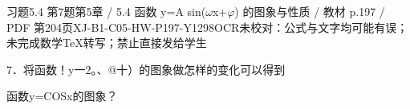 \begin{bankitem}{习题5.4 第7题}{第5章 / 5.4 函数 y=A sin(\ensuremath{\omega}x+\ensuremath{\varphi}) 的图象与性质 / 教材 p.197 / PDF 第204页}{XJ-B1-C05-HW-P197-Y1298}{OCR未校对：公式与文字均可能有误；未完成数学TeX转写；禁止直接发给学生}
\begin{ocrdraft}
\par
7．将函数！y一2。、@十）的图象做怎样的变化可以得到
\par
函数y=COSx的图象？
\end{ocrdraft}
\end{bankitem}
